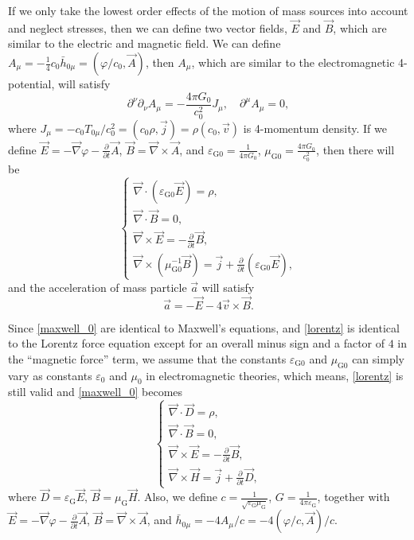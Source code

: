 \documentclass{article}
\def\p{\partial}
\begin{document}
If we only take the lowest order effects of the motion of mass sources into account and neglect stresses, then we can define two vector fields, $\vec{E}$ and $\vec{B}$, which are similar to the electric and magnetic field. We can define $A_\mu=-\frac{1}{4}c_0\bar{h}_{0 \mu}=(\varphi/c_0,\vec{A})$, then $A_\mu$, which are similar to the electromagnetic 4-potential, will satisfy
\begin{equation}
    \p^\nu\p_\nu A_\mu=-\frac{4\pi G_0}{c_0^2}J_\mu,\quad\p^\mu A_\mu=0,
\end{equation}
where $J_\mu=-c_0T_{0 \mu}/c_0^2=(c_0\rho,\vec{j})=\rho(c_0,\vec{v})$ is 4-momentum density. If we define $\vec{E}=-\vec{\nabla}\varphi-\frac{\p}{\p t}\vec{A}$, $\vec{B}=\vec{\nabla}\times\vec{A}$, and $\varepsilon_{\text{G}0}=\frac{1}{4\pi G_0}$, $\mu_{\text{G}0}=\frac{4\pi G_0}{c_0^2}$, then there will be
\begin{equation}\label{maxwell_0}
    \begin{cases}
        \vec{\nabla}\cdot(\varepsilon_{\text{G}0}\vec{E})=\rho,\\
        \vec{\nabla}\cdot\vec{B}=0,\\
        \vec{\nabla}\times\vec{E}=-\frac{\p}{\p t}\vec{B},\\
        \vec{\nabla}\times(\mu_{\text{G}0}^{-1}\vec{B})=\vec{j}+\frac{\p}{\p t}(\varepsilon_{\text{G}0}\vec{E}),
    \end{cases}
\end{equation}
and the acceleration of mass particle $\vec{a}$ will satisfy
\begin{equation}\label{lorentz}
    \vec{a}=-\vec{E}-4\vec{v}\times\vec{B}.
\end{equation}

Since \eqref{maxwell_0} are identical to Maxwell's equations, and \eqref{lorentz} is identical to the Lorentz force equation except for an overall minus sign and a factor of $4$ in the ``magnetic force'' term, we assume that the constants $\varepsilon_{\text{G}0}$ and $\mu_{\text{G}0}$ can simply vary as constants $\varepsilon_{0}$ and $\mu_{0}$ in electromagnetic theories, which means, \eqref{lorentz} is still valid and \eqref{maxwell_0} becomes
\begin{equation}\label{maxwell}
    \begin{cases}
        \vec{\nabla}\cdot\vec{D}=\rho,\\
        \vec{\nabla}\cdot\vec{B}=0,\\
        \vec{\nabla}\times\vec{E}=-\frac{\p}{\p t}\vec{B},\\
        \vec{\nabla}\times\vec{H}=\vec{j}+\frac{\p}{\p t}\vec{D},
    \end{cases}
\end{equation}
where $\vec{D}=\varepsilon_{\text{G}}\vec{E}$, $\vec{B}=\mu_{\text{G}}\vec{H}$. Also, we define $c=\frac{1}{\sqrt{\varepsilon_{\text{G}}\mu_{\text{G}}}}$, $G=\frac{1}{4\pi\varepsilon_{\text{G}}}$, together with $\vec{E}=-\vec{\nabla}\varphi-\frac{\p}{\p t}\vec{A}$, $\vec{B}=\vec{\nabla}\times\vec{A}$, and $\bar{h}_{0 \mu}=-4A_\mu/c=-4(\varphi/c,\vec{A})/c$.
\end{document}
